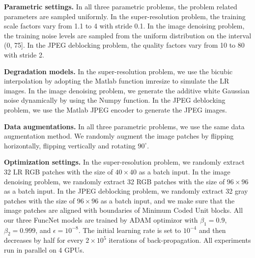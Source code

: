 \documentclass{article}
\begin{document}
\textbf{Parametric settings.} In all three parametric problems, the problem related parameters are sampled uniformly. In the super-resolution problem, the training scale factors vary from 1.1 to 4 with stride 0.1. In the image denoising problem, the training noise levels are sampled from the uniform distribution on the interval (0, 75]. In the JPEG deblocking problem, the quality factors vary from 10 to 80 with stride 2.

\textbf{Degradation models.} In the super-resolution problem, we use the bicubic interpolation by adopting the Matlab function imresize to simulate the LR images. In the image denoising problem, we generate the additive white Gaussian noise dynamically by using the Numpy function. In the JPEG deblocking problem, we use the Matlab JPEG encoder to generate the JPEG images.

\textbf{Data augmentations.} In all three parametric problems, we use the same data augmentation method. We randomly augment the image patches by flipping horizontally, flipping vertically and rotating $90^{\circ}$.

\textbf{Optimization settings.} In the super-resolution problem, we randomly extract 32 LR RGB patches with the size of $40\times40$ as a batch input. In the image denoising problem, we randomly extract 32 RGB patches with the size of $96\times96$ as a batch input. In the JPEG deblocking problem, we randomly extract 32 gray patches with the size of $96\times96$ as a batch input, and we make sure that the image patches are aligned with boundaries of Minimum Coded Unit blocks. All our three FuncNet models are trained by ADAM optimizor with $\beta_1=0.9$, $\beta_2=0.999$, and $\epsilon={10}^{-8}$. The initial learning rate is set to ${10}^{-4}$ and then decreases by half for every $2\times{10}^{5}$ iterations of back-propagation. All experiments run in parallel on 4 GPUs.
\end{document}
